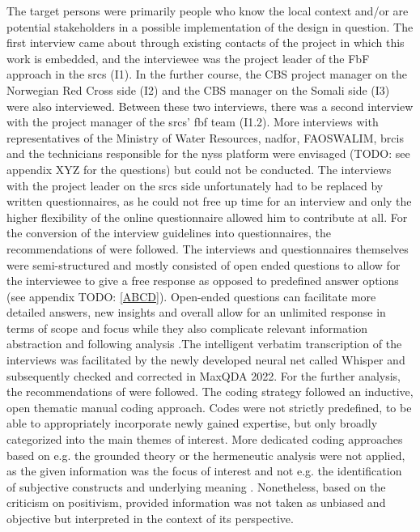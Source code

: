 The target persons were primarily people who know the local context and/or are potential stakeholders in a possible implementation of the design in question. The first interview came about through existing contacts of the project in which this work is embedded, and the interviewee was the project leader of the FbF approach in the \acrshort{srcs} (I1). In the further course, the CBS project manager on the Norwegian Red Cross side (I2) and the CBS manager on the Somali side (I3) were also interviewed. Between these two interviews, there was a second interview with the project manager of the \acrshort{srcs}' \acrshort{fbf} team (I1.2). More interviews with representatives of the Ministry of Water Resources, \acrshort{nadfor}, FAOSWALIM, \acrshort{brcis} and the technicians responsible for the \acrshort{nyss} platform were envisaged (TODO: see appendix XYZ for the questions) but could not be conducted. The interviews with the project leader on the \acrshort{srcs} side unfortunately had to be replaced by written questionnaires, as he could not free up time for an interview and only the higher flexibility of the online questionnaire allowed him to contribute at all. For the conversion of the interview guidelines into questionnaires, the recommendations of \autocite{harknessCCSGQuestionnaireDesign2016} were followed. The interviews and questionnaires themselves were semi-structured and mostly consisted of open ended questions to allow for the interviewee to give a free response as opposed to predefined answer options (see appendix TODO: \ref*{ABCD}). Open-ended questions can facilitate more detailed answers, new insights and overall allow for an unlimited response in terms of scope and focus while they also complicate relevant information abstraction and following analysis \autocite{pelzResearchMethodsSocial}.\linebreak[1]
The intelligent verbatim transcription of the interviews was facilitated by the newly developed neural net called Whisper \autocite{openaiIntroducingWhisper2022,openaiWhisper2023} and subsequently checked and corrected in MaxQDA 2022. For the further analysis, the recommendations of \autocite{radikerFocusedAnalysisQualitative2020} were followed. The coding strategy followed an inductive, open thematic manual coding approach. Codes were not strictly predefined, to be able to appropriately incorporate newly gained expertise, but only broadly categorized into the main themes of interest. More dedicated coding approaches based on e.g. the grounded theory or the hermeneutic analysis were not applied, as the given information was the focus of interest and not e.g. the identification of subjective constructs and underlying meaning \autocite{pelzResearchMethodsSocial}. Nonetheless, based on the criticism on positivism, provided information was not taken as unbiased and objective but interpreted in the context of its perspective.





